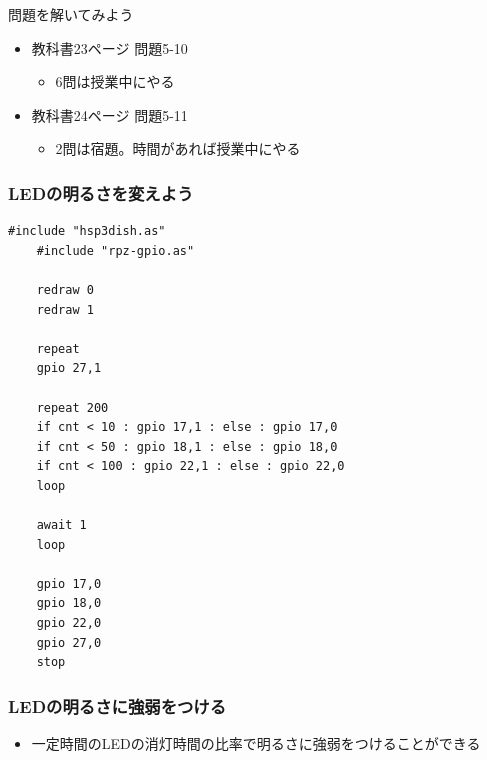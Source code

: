 \begin{frame}[fragile]
    \begin{exampleblock}{問題を解いてみよう}
    \begin{itemize}
        \item 教科書23ページ 問題5-10
        \begin{itemize}
            \item 6問は授業中にやる
        \end{itemize}
        \item 教科書24ページ 問題5-11
        \begin{itemize}
            \item 2問は宿題。時間があれば授業中にやる
        \end{itemize}
    \end{itemize}
    \end{exampleblock}
\end{frame}

\begin{frame}[fragile]
    \frametitle{LEDの明るさを変えよう}
    \begin{lstlisting}[title=\textasciitilde/05/pwm.hsp]
    #include "hsp3dish.as"
    #include "rpz-gpio.as"

    redraw 0
    redraw 1

    repeat
    gpio 27,1

    repeat 200
    if cnt < 10 : gpio 17,1 : else : gpio 17,0
    if cnt < 50 : gpio 18,1 : else : gpio 18,0
    if cnt < 100 : gpio 22,1 : else : gpio 22,0
    loop

    await 1
    loop

    gpio 17,0
    gpio 18,0
    gpio 22,0
    gpio 27,0
    stop
    \end{lstlisting}
\end{frame}

\begin{frame}
    \frametitle{LEDの明るさに強弱をつける}
    \begin{center}
        \begin{figure}
            
        \end{figure}
        \begin{itemize}
            \item 一定時間のLEDの消灯時間の比率で明るさに強弱をつけることができる
        \end{itemize}
    \end{center}
\end{frame}